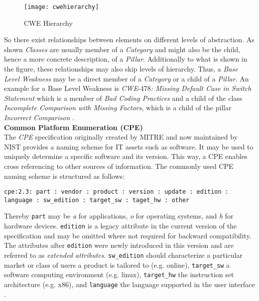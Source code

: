 \begin{figure}[H]
	\centering
	\texttt{[image: cwehierarchy]}
	\caption[CWE Hierarchy]{CWE Hierarchy }
	\label{fig:CWE Hierarchy}
\end{figure}

So there exist relationships between elements on different levels of abstraction. As shown \textit{Classes} are usually member of a \textit{Category} and might also be the child, hence a more concrete description, of a \textit{Pillar}. Additionally to what is shown in the figure, these relationships may also skip levels of hierarchy. Thus, a \textit{Base Level Weakness} may be a direct member of a \textit{Category} or a child of a \textit{Pillar}. An example for a Base Level Weakness is \textit{CWE}-478\textit{: Missing Default Case in Switch Statement} which is a member of \textit{Bad Coding Practices} and a child of the class \textit{Incomplete Comparison with Missing Factors}, which is a child of the pillar \textit{Incorrect Comparison} \cite{CWEWebsite}.\\

\noindent
\textbf{Common Platform Enumeration (CPE)}\\
\noindent
The \emph{CPE} specification originally created by MITRE and now maintained by NIST provides a naming scheme for IT assets such as software. It may be used to uniquely determine a specific software and its version. This way, a CPE enables cross referencing to other sources of information. The commonly used CPE naming scheme is structured as follows:\\
\noindent
\begin{lstlisting}[caption=CPE Formatted String Binding, captionpos=b, label=lst:CPE]
cpe:2.3: part : vendor : product : version : update : edition : language : sw_edition : target_sw : taget_hw : other
\end{lstlisting}

Thereby \lstinline|part| may be \textit{a} for applications, \textit{o} for operating systems, and \textit{h} for hardware devices. \lstinline|edition| is a legacy attribute in the current version of the specification and may be omitted where not required for backward compatibility. The attributes after \lstinline|edition| were newly introduced in this version and are referred to as \textit{extended attributes}. \lstinline|sw_edition| should characterize a particular market or class of users a product is tailored to (e.g. online), \lstinline|target_sw| a software computing environment (e.g. linux), \lstinline|target_hw| the instruction set architecture (e.g. x86), and \lstinline|language| the language supported in the user interface \cite{CPESpec}.\\

